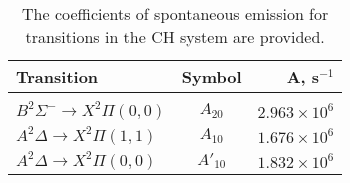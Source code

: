 \begin{table}
  \caption[CH emission coefficients]{The coefficients of spontaneous emission for transitions in the CH system are provided.}
  \begin{center}
    \begin{tabular}{lcr}
      Transition & Symbol & A, s\(^{-1}\) \tabularnewline
      \hline\hline
      & & \tabularnewline
      \(B^2\Sigma^-\rightarrow X^2\Pi(0,0)\) & \(A_{20}\) & \(2.963 \times 10^6\) \tabularnewline
      \(A^2\Delta\rightarrow X^2\Pi(1,1)\) & \(A_{10}\) & \(1.676 \times 10^6\) \tabularnewline
      \(A^2\Delta\rightarrow X^2\Pi(0,0)\) & \(A'_{10}\) & \(1.832 \times 10^6\) \tabularnewline
      \hline
    \end{tabular}
  \end{center}
  \label{tab:emissionCoefficients}
\end{table}

